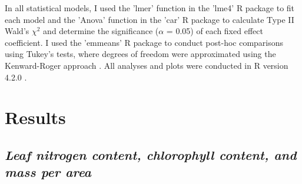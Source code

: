 In all statistical models, I used the 'lmer' function in the 'lme4' R package  to fit each model and the 'Anova' function in the 'car' R package  to calculate Type II Wald's $\chi^{2}$ and determine the significance ($\alpha$ = 0.05) of each fixed effect coefficient. I used the 'emmeans' R package  to conduct post-hoc comparisons using Tukey's tests, where degrees of freedom were approximated using the Kenward-Roger approach . All analyses and plots were conducted in R version 4.2.0 .

\section{Results}
\subsection{\textit{Leaf nitrogen content, chlorophyll content, and mass per area}}
